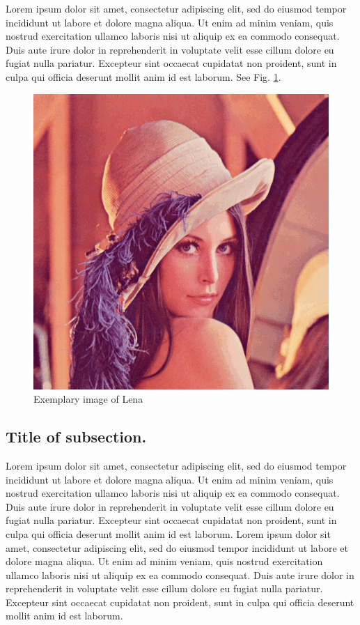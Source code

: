 \documentclass[10pt,twoside,twocolumn,a4paper]{article}
\begin{document}
Lorem ipsum dolor sit amet, consectetur adipiscing elit, sed do eiusmod tempor incididunt ut labore et dolore magna aliqua. Ut enim ad minim veniam, quis nostrud exercitation ullamco laboris nisi ut aliquip ex ea commodo consequat. Duis aute irure dolor in reprehenderit in voluptate velit esse cillum dolore eu fugiat nulla pariatur. Excepteur sint occaecat cupidatat non proident, sunt in culpa qui officia deserunt mollit anim id est laborum. See Fig. \ref{fig:lena}.

\begin{figure}
\begin{center}
\includegraphics[width=0.8\linewidth]{img/lena.png} 
\end{center}
\caption{Exemplary image of Lena} \label{fig:lena}
\end{figure}

\subsection{Title of subsection.}
Lorem ipsum dolor sit amet, consectetur adipiscing elit, sed do eiusmod tempor incididunt ut labore et dolore magna aliqua. Ut enim ad minim veniam, quis nostrud exercitation ullamco laboris nisi ut aliquip ex ea commodo consequat. Duis aute irure dolor in reprehenderit in voluptate velit esse cillum dolore eu fugiat nulla pariatur. Excepteur sint occaecat cupidatat non proident, sunt in culpa qui officia deserunt mollit anim id est laborum.
Lorem ipsum dolor sit amet, consectetur adipiscing elit, sed do eiusmod tempor incididunt ut labore et dolore magna aliqua. Ut enim ad minim veniam, quis nostrud exercitation ullamco laboris nisi ut aliquip ex ea commodo consequat. Duis aute irure dolor in reprehenderit in voluptate velit esse cillum dolore eu fugiat nulla pariatur. Excepteur sint occaecat cupidatat non proident, sunt in culpa qui officia deserunt mollit anim id est laborum.
\end{document}
